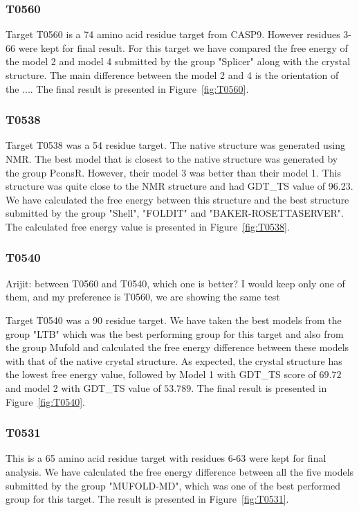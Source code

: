 \documentclass[12pt]{article}
\newcommand{\Alberto}[1]{\color{ForestGreen}#1\normalcolor }
\begin{document}
\subsubsection{T0560}

Target T0560 is a 74 amino acid residue target from CASP9. However residues 3-66 were kept for final
result.  For this target we have compared the free energy of the model 2 and model 4 submitted by
the group "Splicer" along with the crystal structure.  The main difference between the model 2 and 4
is the orientation of the ....  The final result is presented in Figure~\ref{fig:T0560}.

\subsubsection{T0538}

Target T0538 was a 54 residue target. The native structure was generated using NMR. The best model
that is closest to the native structure was generated by the group PconsR. However, their model 3
was better than their model 1. This structure was quite close to the NMR structure and had GDT\_TS
value of 96.23. We have calculated the free energy between this structure and the best structure
submitted by the group "Shell", "FOLDIT" and "BAKER-ROSETTASERVER". The calculated free energy value
is presented in Figure~\ref{fig:T0538}.

\subsubsection{T0540}
\Alberto{Arijit: between T0560 and T0540, which one is better? I would keep only one of them, and my
    preference is T0560, we are showing the same test}

Target T0540 was a 90 residue target. We have taken the best models from the group "LTB" which was
the best performing group for this target and also from the group Mufold and calculated the free
energy difference between these models with that of the native crystal structure.  As expected, the
crystal structure has the lowest free energy value, followed by Model 1 with GDT\_TS score of
$69.72$ and model 2 with GDT\_TS value of $53.789$. The final result is presented in
Figure~\ref{fig:T0540}.


\subsubsection{T0531}

This is a 65 amino acid residue target with residues 6-63 were kept for final analysis. We have
calculated the free energy difference between all the five models submitted by the group
"MUFOLD-MD", which was one of the best performed group for this target.  The result is presented in
Figure~\ref{fig:T0531}.
\end{document}
